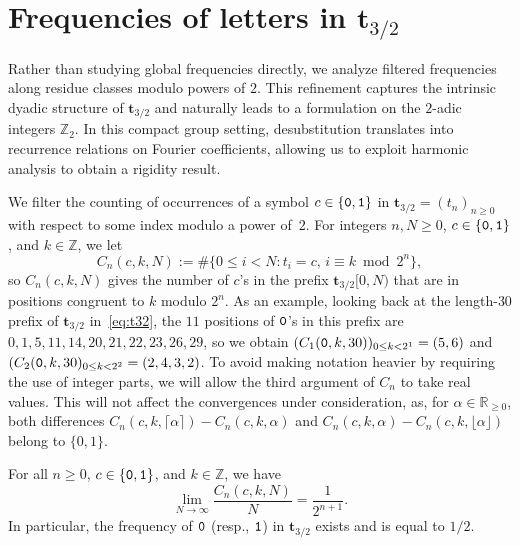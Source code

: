 \documentclass[12pt,reqno]{article}
\newcommand{\cA}{\{{\tt 0},{\tt 1}\}}
\newcommand{\Z}{\mathbb{Z}}
\begin{document}

\section{Frequencies of letters in $\mathbf{t}_{3/2}$}\label{sec:freq}

Rather than studying global frequencies directly, we analyze filtered frequencies along residue classes modulo powers of $2$.  
This refinement captures the intrinsic dyadic structure of $\mathbf{t}_{3/2}$ and naturally leads to a formulation on the $2$-adic integers $\mathbb{Z}_2$. 
In this compact group setting, desubstitution translates into recurrence relations on Fourier coefficients, allowing us to exploit harmonic analysis to obtain a rigidity result.

We filter the counting of occurrences of a symbol $c\in\cA$ in $\mathbf{t}_{3/2}=(t_n)_{n\ge 0}$ with respect to some index modulo a power of~$2$. For integers $n, N \geq 0$,  $c \in \cA$,  and $k \in \Z$,  we let
\begin{equation*}
    C_n(c,k,N) :=
    \#\bigl\{ 0 \leq i < N : t_i = c,\, i \equiv k \bmod 2^n \bigr\},
\end{equation*}
so $C_n(c,k,N)$ gives the number of $c$'s in the prefix $\mathbf{t}_{3/2}[0,N)$ that are in positions congruent to $k$ modulo $2^n$. 
As an example,  looking back at the length-$30$ prefix of $\mathbf{t}_{3/2}$ in~\cref{eq:t32},  the $11$ positions of ${\tt 0}$'s in this prefix are $0, 1, 5, 11, 14, 20, 21, 22, 23, 26, 29$,  so we obtain $(C_1({\tt 0},k,30))_{0\le k < 2^1}=(5,6)$ and $(C_2({\tt 0},k,30)_{0\le k < 2^2}=(2, 4, 3, 2)$.
To avoid making notation heavier by requiring the use of integer parts, we will allow the third argument of $C_n$ to take real values. This will not affect the convergences under consideration,  as,  for $\alpha\in\mathbb{R}_{\ge 0}$, both differences $C_n(c,k,\lceil\alpha\rceil)-C_n(c,k,\alpha)$ and $C_n(c,k,\alpha)-C_n(c,k,\lfloor\alpha\rfloor)$ belong to $\{0,1\}$. 

\begin{theorem}
    \label{thm:existence_freqs_iff_mun_exist}
    For all $n \ge 0$,  $c \in \cA$,  and $k \in \Z$,  we have
    \begin{equation*}
    \lim_{N \to \infty}
    \frac{C_n(c,k,N)}{N} = \frac{1}{2^{n+1}}.
    \end{equation*}
    In particular, the frequency of ${\tt 0}$ (resp.,   ${\tt 1}$) in $\mathbf{t}_{3/2}$ exists and is equal to $1/2$.
\end{theorem}
\end{document}
